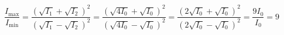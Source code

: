 \begin{enumerate}
\begin{minipage}{\textwidth}
\end{minipage}
\begin{answer}
	$$ \frac{I_{\max }}{I_{\min }}=\frac{\left(\sqrt{I_{1}}+\sqrt{I_{2}}\right)^{2}}{\left(\sqrt{I_{1}}-\sqrt{I_{2}}\right)^{2}}=\frac{\left(\sqrt{4 I_{0}}+\sqrt{I_{0}}\right)^{2}}{\left(\sqrt{4 I_{0}}-\sqrt{I_{0}}\right)^{2}}=\frac{\left(2 \sqrt{I_{0}}+\sqrt{I_{0}}\right)^{2}}{\left(2 \sqrt{I_{0}}-\sqrt{I_{0}}\right)^{2}}=\frac{9 I_{0}}{I_{0}}=9$$	
\end{answer}
\end{enumerate}